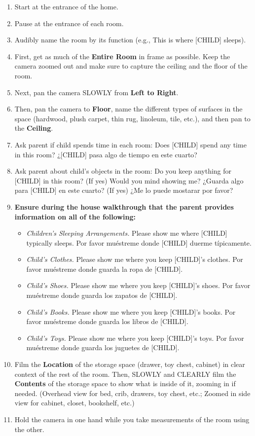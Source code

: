 \documentclass[
  12pt,
]{book}
\providecommand{\tightlist}{%
  \setlength{\itemsep}{0pt}\setlength{\parskip}{0pt}}
\begin{document}
\begin{enumerate}
\def\labelenumi{\arabic{enumi}.}
\tightlist
\item
  Start at the entrance of the home.
\item
  Pause at the entrance of each room.
\item
  Audibly name the room by its function (e.g., This is where {[}CHILD{]} sleeps).
\item
  First, get as much of the \textbf{Entire Room} in frame as possible. Keep the camera zoomed out and make sure to capture the ceiling and the floor of the room.
\item
  Next, pan the camera SLOWLY from \textbf{Left to Right}.
\item
  Then, pan the camera to \textbf{Floor}, name the different types of surfaces in the space (hardwood, plush carpet, thin rug, linoleum, tile, etc.), and then pan to the \textbf{Ceiling}.
\item
  Ask parent if child spends time in each room: Does {[}CHILD{]} spend any time in this room? ¿{[}CHILD{]} pasa algo de tiempo en este cuarto?
\item
  Ask parent about child's objects in the room: Do you keep anything for {[}CHILD{]} in this room? (If yes) Would you mind showing me? ¿Guarda algo para {[}CHILD{]} en este cuarto? (If yes) ¿Me lo puede mostarar por favor?
\item
  \textbf{Ensure during the house walkthrough that the parent provides information on all of the following:}

  \begin{itemize}
  \tightlist
  \item
    \emph{Children's Sleeping Arrangements.} Please show me where {[}CHILD{]} typically sleeps. Por favor muéstreme donde {[}CHILD{]} duerme típicamente.
  \item
    \emph{Child's Clothes.} Please show me where you keep {[}CHILD{]}'s clothes. Por favor muéstreme donde guarda la ropa de {[}CHILD{]}.
  \item
    \emph{Child's Shoes.} Please show me where you keep {[}CHILD{]}'s shoes. Por favor muéstreme donde guarda los zapatos de {[}CHILD{]}.
  \item
    \emph{Child's Books.} Please show me where you keep {[}CHILD{]}'s books. Por favor muéstreme donde guarda los libros de {[}CHILD{]}.
  \item
    \emph{Child's Toys.} Please show me where you keep {[}CHILD{]}'s toys. Por favor muéstreme donde guarda los juguetes de {[}CHILD{]}.
  \end{itemize}
\item
  Film the \textbf{Location} of the storage space (drawer, toy chest, cabinet) in clear context of the rest of the room. Then, SLOWLY and CLEARLY film the \textbf{Contents} of the storage space to show what is inside of it, zooming in if needed. (Overhead view for bed, crib, drawers, toy chest, etc.; Zoomed in side view for cabinet, closet, bookshelf, etc.)
\item
  Hold the camera in one hand while you take measurements of the room using the other.


\end{enumerate}
\end{document}

